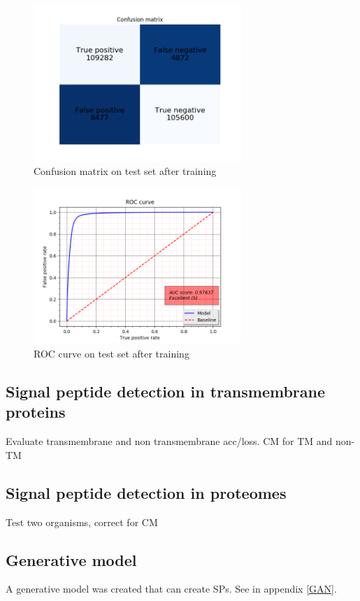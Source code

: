 \begin{figure}[H]
\center
\includegraphics[width=0.7\textwidth]{pictures/train_cm.png}
\caption{\label{fig:train_cm}Confusion matrix on test set after training}
\end{figure}

\begin{figure}[H]
\center
\includegraphics[width=0.7\textwidth]{pictures/train_roc.png}
\caption{\label{fig:train_roc}ROC curve on test set after training}
\end{figure}

\subsection{Signal peptide detection in transmembrane proteins}
Evaluate transmembrane and non transmembrane acc/loss.
CM for TM and non-TM

\subsection{Signal peptide detection in proteomes}
Test two organisms, correct for CM

\subsection{Generative model}
A generative model was created that can create SPs. See in appendix \ref{GAN}.

